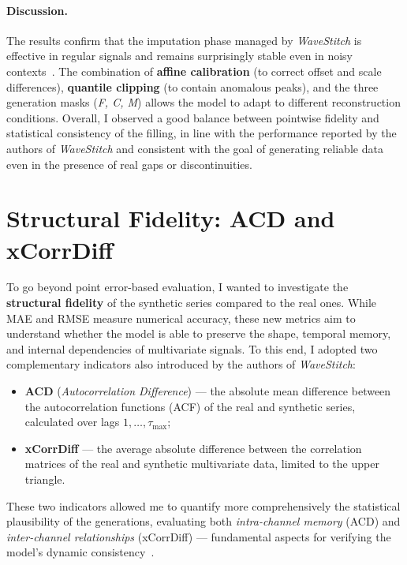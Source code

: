 \paragraph{Discussion.}
The results confirm that the imputation phase managed by \emph{WaveStitch} is effective in regular signals and remains surprisingly stable even in noisy contexts~\cite{che2018recurrent,luo2018multivariate}.  
The combination of \textbf{affine calibration} (to correct offset and scale differences), \textbf{quantile clipping} (to contain anomalous peaks), and the three generation masks (\emph{F, C, M}) allows the model to adapt to different reconstruction conditions.  
Overall, I observed a good balance between pointwise fidelity and statistical consistency of the filling, in line with the performance reported by the authors of \emph{WaveStitch} and consistent with the goal of generating reliable data even in the presence of real gaps or discontinuities.

\section{Structural Fidelity: ACD and xCorrDiff}

To go beyond point error-based evaluation, I wanted to investigate the \textbf{structural fidelity} of the synthetic series compared to the real ones.  
While MAE and RMSE measure numerical accuracy, these new metrics aim to understand whether the model is able to preserve the shape, temporal memory, and internal dependencies of multivariate signals.  
To this end, I adopted two complementary indicators also introduced by the authors of \emph{WaveStitch}:

\begin{itemize}
  \item \textbf{ACD} (\emph{Autocorrelation Difference}) — the absolute mean difference between the autocorrelation functions (ACF) of the real and synthetic series, calculated over lags $1,\dots,\tau_{\max}$;
  \item \textbf{xCorrDiff} — the average absolute difference between the correlation matrices of the real and synthetic multivariate data, limited to the upper triangle.
\end{itemize}

These two indicators allowed me to quantify more comprehensively the statistical plausibility of the generations, evaluating both \emph{intra-channel memory} (ACD) and \emph{inter-channel relationships} (xCorrDiff) — fundamental aspects for verifying the model’s dynamic consistency~\cite{hastie2009elements,box2015time,shumway2017time,wang2013experimental}.

